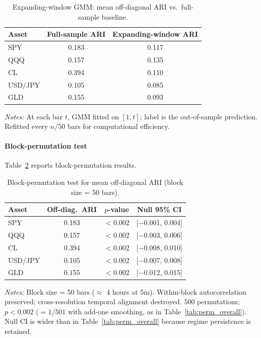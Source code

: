 \documentclass[preprint,12pt,authoryear]{elsarticle}
\begin{document}
\begin{table}[H]
\centering
\small
\setlength{\tabcolsep}{5pt}
\caption{Expanding-window GMM: mean off-diagonal ARI vs.\ full-sample baseline.}
\label{tab:expanding}
\begin{tabular}{lcc}
\toprule
Asset & Full-sample ARI & Expanding-window ARI \\
\midrule
SPY & 0.183 & 0.117 \\
QQQ & 0.157 & 0.135 \\
CL & 0.394 & 0.110 \\
USD/JPY & 0.105 & 0.085 \\
GLD & 0.155 & 0.093 \\
\bottomrule
\end{tabular}
\par\medskip
{\footnotesize\justifying
\textit{Notes:} At each bar $t$, GMM fitted on $[1, t]$; label is the out-of-sample prediction. Refitted every $n/50$ bars for computational efficiency.
\par}
\end{table}

\paragraph{Block-permutation test}
Table~\ref{tab:block_perm} reports block-permutation results.

\begin{table}[H]
\centering
\small
\setlength{\tabcolsep}{5pt}
\caption{Block-permutation test for mean off-diagonal ARI (block size = 50 bars).}
\label{tab:block_perm}
\begin{tabular}{lccc}
\toprule
Asset & Off-diag.\ ARI & $p$-value & Null 95\% CI \\
\midrule
SPY & 0.183 & $<$0.002 & [$-$0.001, 0.004] \\
QQQ & 0.157 & $<$0.002 & [$-$0.003, 0.006] \\
CL & 0.394 & $<$0.002 & [$-$0.008, 0.010] \\
USD/JPY & 0.105 & $<$0.002 & [$-$0.007, 0.008] \\
GLD & 0.155 & $<$0.002 & [$-$0.012, 0.015] \\
\bottomrule
\end{tabular}
\par\medskip
{\footnotesize\justifying
\textit{Notes:} Block size = 50 bars ($\approx$ 4 hours at 5m). Within-block autocorrelation preserved; cross-resolution temporal alignment destroyed. 500 permutations; $p < 0.002$ ($= 1/501$ with add-one smoothing, as in Table~\ref{tab:perm_overall}). Null CI is wider than in Table~\ref{tab:perm_overall} because regime persistence is retained.
\par}
\end{table}
\end{document}
